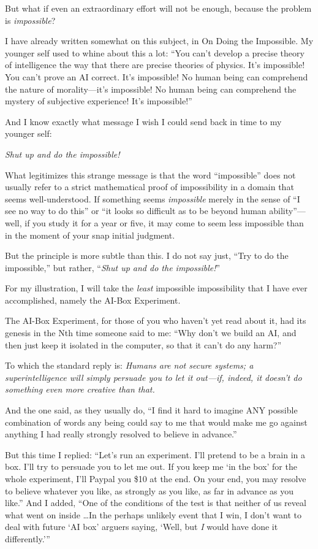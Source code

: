 {
 But what if even an extraordinary effort will not be enough,
because the problem is \textit{impossible}?}

{
 I have already written somewhat on this subject, in On Doing the
Impossible. My younger self used to whine about this a lot:
``You can't develop a precise theory
of intelligence the way that there are precise theories of physics.
It's impossible! You can't prove an AI
correct. It's impossible! No human being can comprehend
the nature of morality---it's impossible! No human
being can comprehend the mystery of subjective experience!
It's impossible!''}

{
 And I know exactly what message I wish I could send back in time
to my younger self:}

{
 \textit{Shut up and do the impossible!}}

{
 What legitimizes this strange message is that the word
``impossible'' does not usually
refer to a strict mathematical proof of impossibility in a domain that
seems well-understood. If something seems \textit{impossible} merely in
the sense of ``I see no way to do
this'' or ``it looks so difficult as
to be beyond human ability''---well, if you study it
for a year or five, it may come to seem less impossible than in the
moment of your snap initial judgment.}

{
 But the principle is more subtle than this. I do not say just,
``Try to do the impossible,'' but
rather, ``\textit{Shut up and do the
impossible!}''}

{
 For my illustration, I will take the \textit{least} impossible
impossibility that I have ever accomplished, namely the AI-Box
Experiment.}

{
 The AI-Box Experiment, for those of you who
haven't yet read about it, had its genesis in the Nth
time someone said to me: ``Why don't
we build an AI, and then just keep it isolated in the computer, so that
it can't do any harm?''}

{
 To which the standard reply is: \textit{Humans are not secure
systems; a superintelligence will simply persuade you to let it
out---if, indeed, it doesn't do something even more
creative than that.}}

{
 And the one said, as they usually do, ``I find it
hard to imagine ANY possible combination of words any being could say
to me that would make me go against anything I had really strongly
resolved to believe in advance.''}

{
 But this time I replied: ``Let's
run an experiment. I'll pretend to be a brain in a box.
I'll try to persuade you to let me out. If you keep me
`in the box' for the whole experiment,
I'll Paypal you \$10 at the end. On your end, you may
resolve to believe whatever you like, as strongly as you like, as far
in advance as you like.'' And I added,
``One of the conditions of the test is that neither of
us reveal what went on inside \ldots In the perhaps unlikely event that
I win, I don't want to deal with future
`AI box' arguers saying,
`Well, but \textit{I} would have done it
differently.'''}

